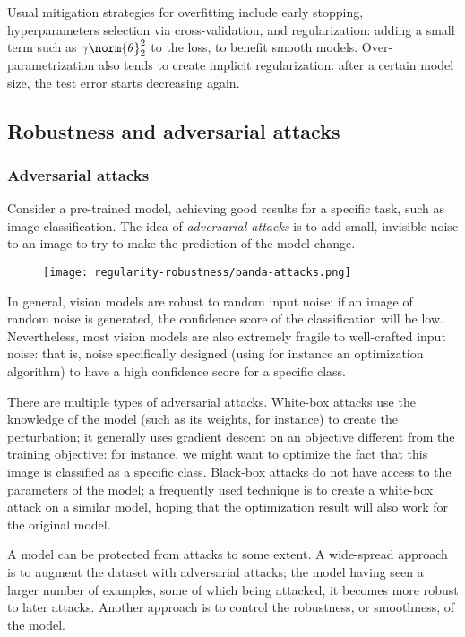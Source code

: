 Usual mitigation strategies for overfitting include early stopping, hyperparameters selection via cross-validation, and regularization: adding a small term such as $\gamma\norm{\theta}_2^2$ to the loss, to benefit smooth models. Over-parametrization also tends to create implicit regularization: after a certain model size, the test error starts decreasing again.

\subsection{Robustness and adversarial attacks}
\subsubsection{Adversarial attacks}
Consider a pre-trained model, achieving good results for a specific task, such as image classification. The idea of \emph{adversarial attacks} is to add small, invisible noise to an image to try to make the prediction of the model change.
\begin{figure}[H]
    \centering
    \texttt{[image: regularity-robustness/panda-attacks.png]}
\end{figure}
In general, vision models are robust to random input noise: if an image of random noise is generated, the confidence score of the classification will be low. Nevertheless, most vision models are also extremely fragile to well-crafted input noise: that is, noise specifically designed (using for instance an optimization algorithm) to have a high confidence score for a specific class.

There are multiple types of adversarial attacks. White-box attacks use the knowledge of the model (such as its weights, for instance) to create the perturbation; it generally uses gradient descent on an objective different from the training objective: for instance, we might want to optimize the fact that this image is classified as a specific class. Black-box attacks do not have access to the parameters of the model; a frequently used technique is to create a white-box attack on a similar model, hoping that the optimization result will also work for the original model.

A model can be protected from attacks to some extent. A wide-spread approach is to augment the dataset with adversarial attacks; the model having seen a larger number of examples, some of which being attacked, it becomes more robust to later attacks. Another approach is to control the robustness, or smoothness, of the model.

